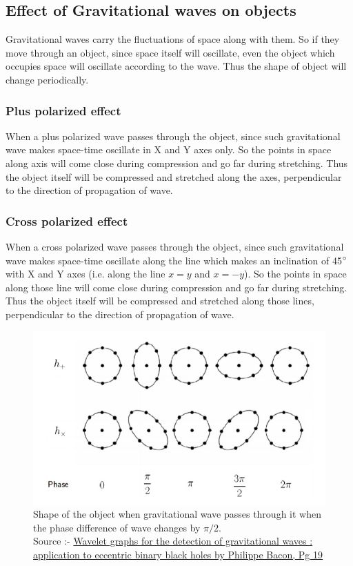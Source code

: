 \subsection{Effect of Gravitational waves on objects}

Gravitational waves carry the fluctuations of space along with them. So if they move through an object, since space itself will oscillate, even the object which occupies space will oscillate according to the wave. Thus the shape of object will change periodically.  

\subsubsection{Plus polarized effect}
When a plus polarized wave passes through the object, since such gravitational wave makes space-time oscillate in X and Y axes only. So the points in space along axis will come close during compression and go far during stretching. Thus the object itself will be compressed and stretched along the axes, perpendicular to the direction of propagation of wave.

\subsubsection{Cross polarized effect}
When a cross polarized wave passes through the object, since such gravitational wave makes space-time oscillate along the line which makes an inclination of 45$\degree$ with X and Y axes (i.e. along the line $x=y$ and $x=-y$). So the points in space along those line will come close during compression and go far during stretching. Thus the object itself will be compressed and stretched along those lines, perpendicular to the direction of propagation of wave.
\\

\begin{figure}[h]
    \centering
    \includegraphics[scale=0.42]{images.tex/effect_of_gw.jpeg}
    \caption{Shape of the object when gravitational wave passes through it when the phase difference of wave changes by $\pi/2$.\\
    Source :- \href{https://inspirehep.net/literature/1787298}{Wavelet graphs for the detection of gravitational waves : application to eccentric binary black holes by Philippe Bacon, Pg 19}}
\end{figure}

